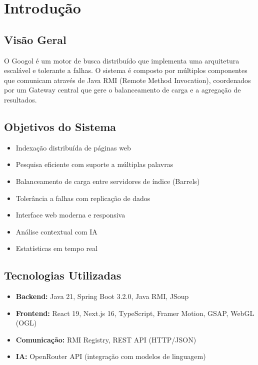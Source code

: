 \documentclass[12pt,a4paper]{article}
\begin{document}
\newpage

\section{Introdução}

\subsection{Visão Geral}
O Googol é um motor de busca distribuído que implementa uma arquitetura escalável e tolerante a falhas. O sistema é composto por múltiplos componentes que comunicam através de Java RMI (Remote Method Invocation), coordenados por um Gateway central que gere o balanceamento de carga e a agregação de resultados.

\subsection{Objetivos do Sistema}
\begin{itemize}
    \item Indexação distribuída de páginas web
    \item Pesquisa eficiente com suporte a múltiplas palavras
    \item Balanceamento de carga entre servidores de índice (Barrels)
    \item Tolerância a falhas com replicação de dados
    \item Interface web moderna e responsiva
    \item Análise contextual com IA
    \item Estatísticas em tempo real
\end{itemize}

\subsection{Tecnologias Utilizadas}
\begin{itemize}
    \item \textbf{Backend:} Java 21, Spring Boot 3.2.0, Java RMI, JSoup
    \item \textbf{Frontend:} React 19, Next.js 16, TypeScript, Framer Motion, GSAP, WebGL (OGL)
    \item \textbf{Comunicação:} RMI Registry, REST API (HTTP/JSON)
    \item \textbf{IA:} OpenRouter API (integração com modelos de linguagem)
\end{itemize}
\end{document}
